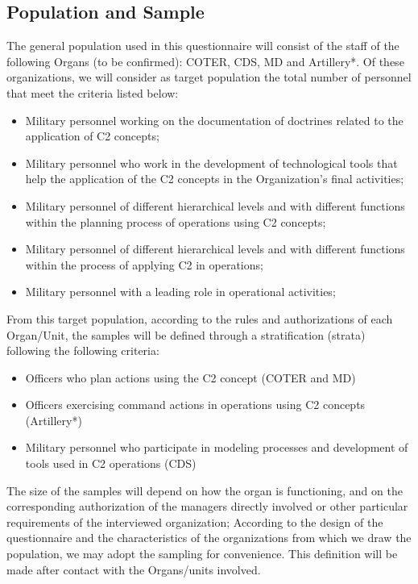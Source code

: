 \subsection{Population and Sample}

The general population used in this questionnaire will consist of the staff of the following Organs (to be confirmed): COTER, CDS, MD and Artillery*.
Of these organizations, we will consider as target population the total number of personnel that meet the criteria listed below:

\begin{itemize}
    \item Military personnel working on the documentation of doctrines related to the application of C2 concepts;
    \item Military personnel who work in the development of technological tools that help the application of the C2 concepts in the Organization's final activities;
    \item Military personnel of different hierarchical levels and with different functions within the planning process of operations using C2 concepts;
    \item Military personnel of different hierarchical levels and with different functions within the process of applying C2 in operations;
    \item Military personnel with a leading role in operational activities;
\end{itemize}

From this target population, according to the rules and authorizations of each Organ/Unit, the samples will be defined through a stratification (strata) following the following criteria:

\begin{itemize}
    \item Officers who plan actions using the C2 concept (COTER and MD)
    \item Officers exercising command actions in operations using C2 concepts (Artillery*)
    \item Military personnel who participate in modeling processes and development of tools used in C2 operations (CDS)
\end{itemize}

The size of the samples will depend on how the organ is functioning, and on the corresponding authorization of the managers directly involved or other particular requirements of the interviewed organization; According to the design of the questionnaire and the characteristics of the organizations from which we draw the population, we may adopt the sampling for convenience. This definition will be made after contact with the Organs/units involved.


